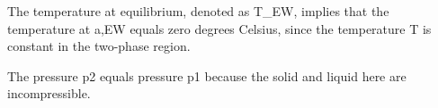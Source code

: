 The temperature at equilibrium, denoted as T_EW, implies that the temperature at a,EW equals zero degrees Celsius, since the temperature T is constant in the two-phase region.

The pressure p2 equals pressure p1 because the solid and liquid here are incompressible.